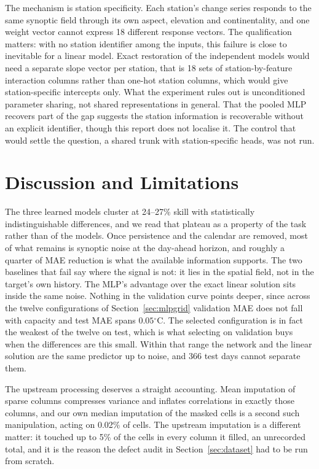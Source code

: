 \documentclass[11pt,a4paper]{article}
\newcommand{\tc}{\ensuremath{^{\circ}\mathrm{C}}}
\begin{document}
The mechanism is station specificity. Each station's change series responds to the same synoptic field through its own aspect, elevation and continentality, and one weight vector cannot express 18 different response vectors. The qualification matters: with no station identifier among the inputs, this failure is close to inevitable for a linear model. Exact restoration of the independent models would need a separate slope vector per station, that is 18 sets of station-by-feature interaction columns rather than one-hot station columns, which would give station-specific intercepts only. What the experiment rules out is unconditioned parameter sharing, not shared representations in general. That the pooled MLP recovers part of the gap suggests the station information is recoverable without an explicit identifier, though this report does not localise it. The control that would settle the question, a shared trunk with station-specific heads, was not run.

\section{Discussion and Limitations}
\label{sec:discussion}

The three learned models cluster at 24--27\% skill with statistically indistinguishable differences, and we read that plateau as a property of the task rather than of the models. Once persistence and the calendar are removed, most of what remains is synoptic noise at the day-ahead horizon, and roughly a quarter of MAE reduction is what the available information supports. The two baselines that fail say where the signal is not: it lies in the spatial field, not in the target's own history. The MLP's advantage over the exact linear solution sits inside the same noise. Nothing in the validation curve points deeper, since across the twelve configurations of Section~\ref{sec:mlpgrid} validation MAE does not fall with capacity and test MAE spans $0.05\tc$. The selected configuration is in fact the weakest of the twelve on test, which is what
selecting on validation buys when the differences are this small. Within that range the network and the linear
solution are the same predictor up to noise, and 366 test days cannot separate them.

The upstream processing deserves a straight accounting. Mean imputation of sparse columns compresses variance and inflates correlations in exactly those columns, and our own median imputation of the masked cells is a second such manipulation, acting on 0.02\% of cells. The upstream imputation is a different matter: it touched up to 5\% of the cells in every column it filled, an unrecorded total, and it is the reason the defect audit in Section~\ref{sec:dataset} had to be run from scratch.
\end{document}
